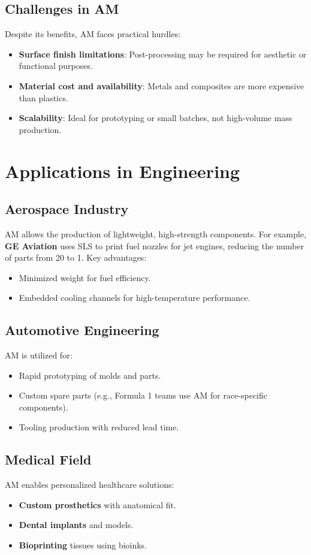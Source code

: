 \documentclass[12pt]{article}
\begin{document}
\subsection{Challenges in AM}
Despite its benefits, AM faces practical hurdles:
\begin{itemize}
    \item \textbf{Surface finish limitations}: Post-processing may be required for aesthetic or functional purposes.
    \item \textbf{Material cost and availability}: Metals and composites are more expensive than plastics.
    \item \textbf{Scalability}: Ideal for prototyping or small batches, not high-volume mass production.
\end{itemize}

\section{Applications in Engineering}

\subsection{Aerospace Industry}
AM allows the production of lightweight, high-strength components. For example, \textbf{GE Aviation} uses SLS to print fuel nozzles for jet engines, reducing the number of parts from 20 to 1. Key advantages:
\begin{itemize}
    \item Minimized weight for fuel efficiency.
    \item Embedded cooling channels for high-temperature performance.
\end{itemize}

\subsection{Automotive Engineering}
AM is utilized for:
\begin{itemize}
    \item Rapid prototyping of molds and parts.
    \item Custom spare parts (e.g., Formula 1 teams use AM for race-specific components).
    \item Tooling production with reduced lead time.
\end{itemize}

\subsection{Medical Field}
AM enables personalized healthcare solutions:
\begin{itemize}
    \item \textbf{Custom prosthetics} with anatomical fit.
    \item \textbf{Dental implants} and models.
    \item \textbf{Bioprinting} tissues using bioinks.
\end{itemize}
\end{document}
